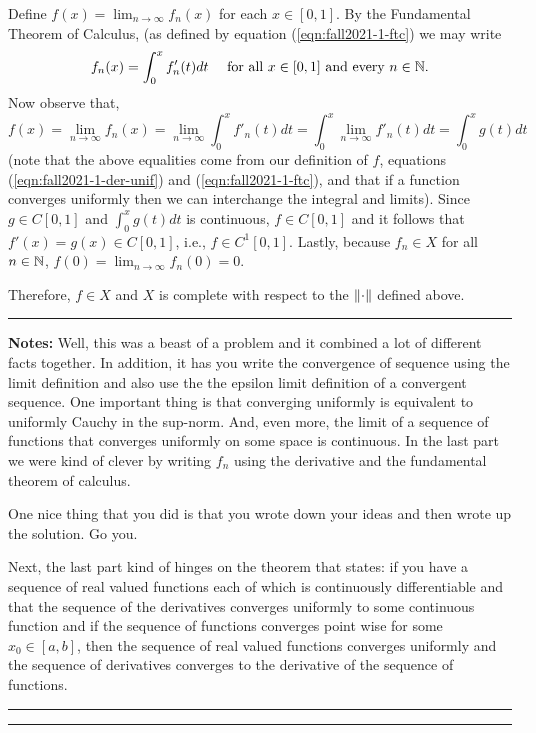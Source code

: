 \documentclass{article}
\begin{document}
Define $f(x) = \lim_{n\to\infty}f_n(x)$ for each $x\in[0,1]$. By the Fundamental Theorem of Calculus, (as defined by equation (\ref{eqn:fall2021-1-ftc}) we may write 
	\begin{equation*}
	 f_n(x) = \int_0^x f'_n(t) dt \quad \text{ for all } x\in [0,1] \text{ and every } n\in \mathbb N.
	 \end{equation*}
Now observe that,
	\[f(x) = \lim_{n \to \infty} f_n(x) = \lim_{n \to \infty} \int_0^x f'_n(t) dt = \int_0^x \lim_{n\to \infty} f'_n(t) dt = \int_0^x g(t) dt\]
(note that the above equalities come from our definition of $f$, equations (\ref{eqn:fall2021-1-der-unif}) and 
(\ref{eqn:fall2021-1-ftc}), and that if a function converges uniformly then we can interchange the integral and limits). 
Since $g\in C[0,1]$ and $\int_0^x g(t) dt$ is continuous, $f\in C[0,1]$ and it follows that $f'(x) = g(x) \in C[0,1]$, i.e.,
 $f\in C^1[0,1]$. Lastly, because $f_n\in X$ for all $n\in \mathbb N$, $f(0) = \lim_{n\to\infty} f_n(0) = 0$. 

Therefore, $f\in X$ and $X$ is complete with respect to the $\left\lVert {\cdot} \right\rVert$ defined above.\\

\hrule

\textbf{Notes:} Well, this was a beast of a problem and it combined a lot of different facts together. In addition, it has you write the convergence of sequence using the limit definition and also use the the epsilon limit definition of a convergent sequence. One important thing is that converging uniformly is equivalent to uniformly Cauchy in the sup-norm. And, even more, the limit of a sequence of functions that converges uniformly on some space is continuous. In the last part we were kind of clever by writing $f_n$ using the derivative and the fundamental theorem of calculus. 

One nice thing that you did is that you wrote down your ideas and then wrote up the solution. Go you.

Next, the last part kind of hinges on the theorem that states: if you have a sequence of real valued functions each of which is continuously differentiable and that the sequence of the derivatives converges uniformly to some continuous function and if the sequence of functions converges point wise for some $x_0\in [a,b]$, then the sequence of real valued functions converges uniformly and the sequence of derivatives converges to the derivative of the sequence of functions.\\

\hrule\vspace{2pt}
\hrule
\end{document}
